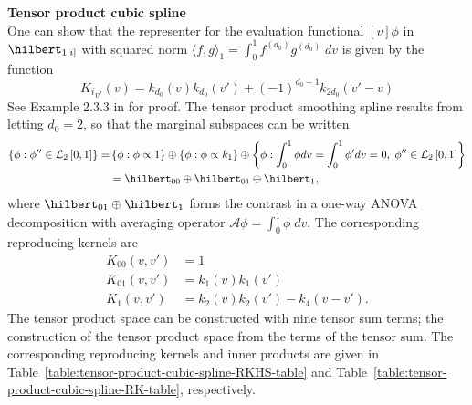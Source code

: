 \begin{example}{\textbf {Tensor product cubic spline}}
\[\]
One can show that the representer for the evaluation functional $\left[v\right] \phi$ in $\hilbert_{1\left[i\right]}$ with squared norm $\langle f,g\rangle_1= \int_0^1 f^{\left(d_0\right)}g^{\left(d_0\right)}\;dv$ is given by the function
\begin{equation}
{K_{i} }_{v'}\left(v\right) = k_{d_0}\left(v\right)k_{d_0}\left(v'\right) + \left(-1\right)^{d_0-1}k_{2d_0}\left(v' - v\right)
\end{equation}
\noindent
See Example 2.3.3 in \cite{gu2002smoothing} for proof. The tensor product smoothing spline results from letting $d_0= 2$, so that the marginal subspaces can be written
\begin{align*} %
\left\{ \phi: \phi'' \in \mathcal{L}_2\left[0,1\right] \right\} = &\left\{ \phi: \phi \propto 1 \right\} \oplus  \left\{ \phi: \phi \propto k_1 \right\} \oplus \left\{ \phi: \int_0^1 \phi dv = \int_0^1 \phi' dv = 0,\; \phi'' \in \mathcal{L}_2\left[0,1\right]  \right\} \\
&= \hilbert_{00} \oplus \hilbert_{01} \oplus \hilbert_1,
\end{align*}
\noindent
where $ \hilbert_{01} \oplus \hilbert_1$ forms the contrast in a one-way ANOVA decomposition with averaging operator $\mathcal{A}\phi = \int_0^1 \phi\;dv$. The corresponding reproducing kernels are
\begin{align*}%
K_{00}\left(v,v'\right) &= 1\\
K_{01}\left(v,v'\right) &= k_1\left(v\right)k_1\left(v'\right)\\
K_{1}\left(v,v'\right) &= k_2\left(v\right)k_2\left(v'\right) - k_4\left(v-v'\right).
\end{align*}
\noindent
The tensor product space can be constructed with nine tensor sum terms; the construction of the tensor product space from the terms of the tensor sum. The corresponding reproducing kernels and inner products are given in Table~\ref{table:tensor-product-cubic-spline-RKHS-table} and Table~\ref{table:tensor-product-cubic-spline-RK-table}, respectively.


\end{example}

